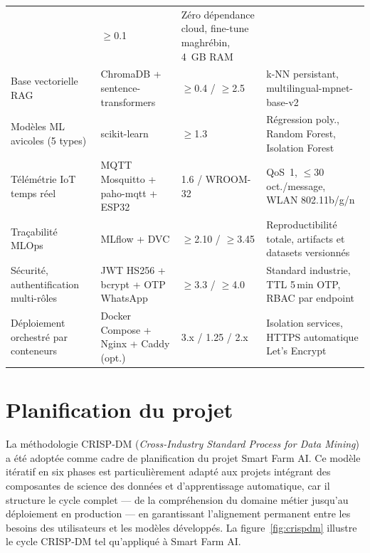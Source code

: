 \begin{table}[H]
{\begin{tabular}{llll}
  & $\geq$0.1
  & Zéro dépendance cloud, fine-tune maghrébin, 4~GB RAM \\
\addlinespace
Base vectorielle RAG
  & ChromaDB + sentence-transformers
  & $\geq$0.4 / $\geq$2.5
  & k-NN persistant, multilingual-mpnet-base-v2 \\
\addlinespace
Modèles ML avicoles (5 types)
  & scikit-learn
  & $\geq$1.3
  & Régression poly., Random Forest, Isolation Forest \\
\addlinespace
Télémétrie IoT temps réel
  & MQTT Mosquitto + paho-mqtt + ESP32
  & 1.6 / WROOM-32
  & QoS~1, $\leq30$ oct./message, WLAN 802.11b/g/n \\
\addlinespace
Traçabilité MLOps
  & MLflow + DVC
  & $\geq$2.10 / $\geq$3.45
  & Reproductibilité totale, artifacts et datasets versionnés \\
\addlinespace
Sécurité, authentification multi-rôles
  & JWT HS256 + bcrypt + OTP WhatsApp
  & $\geq$3.3 / $\geq$4.0
  & Standard industrie, TTL 5\,min OTP, RBAC par endpoint \\
\addlinespace
Déploiement orchestré par conteneurs
  & Docker Compose + Nginx + Caddy (opt.)
  & 3.x / 1.25 / 2.x
  & Isolation services, HTTPS automatique Let's Encrypt \\
\bottomrule
\end{tabular}
}%
\end{table}

\section{Planification du projet}

La méthodologie CRISP-DM (\textit{Cross-Industry Standard Process for Data Mining})~%
\cite{wirth2000} a été adoptée comme cadre de planification du projet Smart Farm AI.
Ce modèle itératif en six phases est particulièrement adapté aux projets intégrant
des composantes de science des données et d'apprentissage automatique, car il structure
le cycle complet --- de la compréhension du domaine métier jusqu'au déploiement en
production --- en garantissant l'alignement permanent entre les besoins des
utilisateurs et les modèles développés.
La figure~\ref{fig:crispdm} illustre le cycle CRISP-DM tel qu'appliqué à Smart Farm AI.

